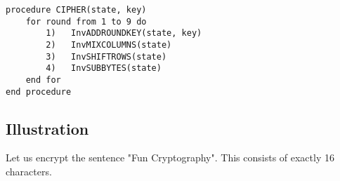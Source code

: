 \vspace{3mm}
\begin{tcolorbox}[colback=gray!20, colframe=blue!30, left =2cm, boxsep=2mm, title={\small \bfseries \textcolor{black}{Decryption Algorithm}}, width=15cm]
\begin{verbatim}
procedure CIPHER(state, key)
    for round from 1 to 9 do
        1)   InvADDROUNDKEY(state, key)
        2)   InvMIXCOLUMNS(state)
        3)   InvSHIFTROWS(state)
        4)   InvSUBBYTES(state)
    end for
end procedure
\end{verbatim}\cite{aes}
\end{tcolorbox}
\vspace{3mm}

\subsection{Illustration}
Let us encrypt the sentence "Fun Cryptography". This consists of exactly 16 characters.\vspace{2mm}


